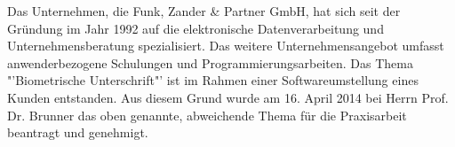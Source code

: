 Das Unternehmen, die Funk, Zander \& Partner GmbH, hat sich seit der Gründung im Jahr 1992 auf die elektronische Datenverarbeitung und Unternehmensberatung spezialisiert. Das weitere Unternehmensangebot umfasst anwenderbezogene Schulungen und Programmierungsarbeiten. Das Thema "'Biometrische Unterschrift"' ist im Rahmen einer Softwareumstellung eines Kunden entstanden. Aus diesem Grund wurde am 16. April 2014 bei Herrn Prof. Dr. Brunner das oben genannte, abweichende Thema für die Praxisarbeit beantragt und genehmigt.
